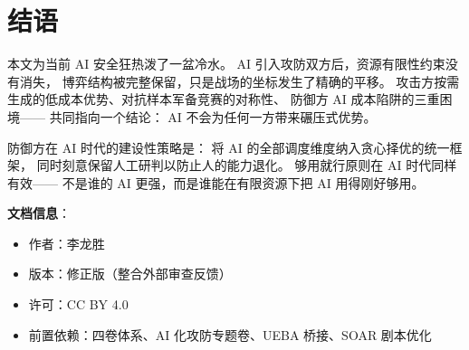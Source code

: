 \documentclass[11pt,a4paper]{article}
\begin{document}
\section{结语}

本文为当前 AI 安全狂热泼了一盆冷水。
AI 引入攻防双方后，资源有限性约束没有消失，
博弈结构被完整保留，只是战场的坐标发生了精确的平移。
攻击方按需生成的低成本优势、对抗样本军备竞赛的对称性、
防御方 AI 成本陷阱的三重困境——
共同指向一个结论：
AI 不会为任何一方带来碾压式优势。

防御方在 AI 时代的建设性策略是：
将 AI 的全部调度维度纳入贪心择优的统一框架，
同时刻意保留人工研判以防止人的能力退化。
够用就行原则在 AI 时代同样有效——
不是谁的 AI 更强，而是谁能在有限资源下把 AI 用得刚好够用。

\vspace{5mm}
\noindent\textbf{文档信息}：
\begin{itemize}
    \item 作者：李龙胜
    \item 版本：修正版（整合外部审查反馈）
    \item 许可：CC BY 4.0
    \item 前置依赖：四卷体系、AI 化攻防专题卷、UEBA 桥接、SOAR 剧本优化
\end{itemize}
\end{document}
